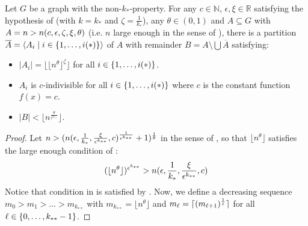     \begin{theorem}[Theorem 4.23] \label{thm:equitative_partition_high_regularity_parts_grow_with_n}
        Let $G$ be a graph with the non-$k_*$-property.
        For any $c \in \mathbb{N}$, $\epsilon, \xi \in \mathbb{R}$ satisfying the hypothesis of 
        (with $k = k_*$ and $\zeta = \frac{1}{k_*}$), any $\theta \in (0,1)$ and $A \subseteq G$ with
        $A = n > n( c, \epsilon, \zeta, \xi, \theta )$ (i.e. $n$ large enough in the sense of ),
        there is a partition $\overline{A} = \left< A_i \mid i \in \{ 1, \dots, i(*) \} \right>$ of $A$ with remainder $B = A \setminus \bigcup \overline{A}$
        satisfying:
        \begin{itemize}
            \item $|A_i| = \lfloor \lfloor n^\theta \rfloor ^\zeta \rfloor$ for all $i \in \{ 1, \dots, i(*) \}$.
            \item $A_i$ is $c$-indivisible for all $i \in \{ 1, \dots, i(*) \}$ where $c$ is the constant function $f(x) = c$.
            \item $|B| < \lfloor n^{\frac{\theta}{\epsilon^{k_{**}}}} \rfloor$.
        \end{itemize}
        \begin{proof}
            Let $n > ( n(  \epsilon, \frac{1}{k_*}, \frac{\xi}{\epsilon^{k_{**}}}, c )^{\frac{1}{\epsilon^{k_{**}}}} + 1  )^{\frac{1}{\theta}}$
            in the sense of , so that $\lfloor n^\theta \rfloor$ satisfies the
            large enough condition of :
            \[
                ( \lfloor n^\theta \rfloor )^{\epsilon^{k_{**}}}
                    > n( \epsilon, \frac{1}{k_*}, \frac{\xi}{\epsilon^{k_{**}}}, c )
            \]
            Notice that condition  in
            is satisfied by .
            Now, we define a decreasing sequence $m_0 > m_1 > \dots > m_{k_{**}}$ with $m_{k_{**}} = \lfloor n^\theta \rfloor$
            and $m_{\ell} = \lceil ( m_{\ell+1} )^{\frac{1}{\epsilon}} \rceil$ for all $\ell \in \{ 0, \dots, k_{**}-1 \}$.

\end{proof}
\end{theorem}
